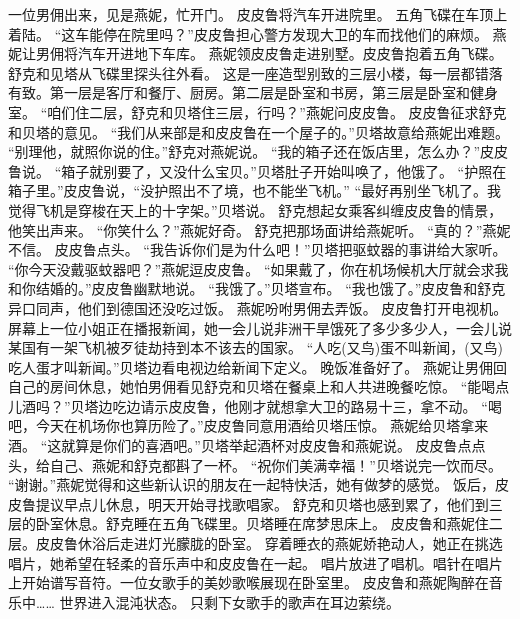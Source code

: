 \documentclass[a4paper,12pt,UTF8,twoside]{ctexbook}
\begin{document}
        一位男佣出来，见是燕妮，忙开门。 
        皮皮鲁将汽车开进院里。 
        五角飞碟在车顶上着陆。 
        “这车能停在院里吗？”皮皮鲁担心警方发现大卫的车而找他们的麻烦。 
        燕妮让男佣将汽车开进地下车库。 
        燕妮领皮皮鲁走进别墅。皮皮鲁抱着五角飞碟。舒克和见塔从飞碟里探头往外看。 
        这是一座造型别致的三层小楼，每一层都错落有致。第一层是客厅和餐厅、厨房。第二层是卧室和书房，第三层是卧室和健身室。 
        “咱们住二层，舒克和贝塔住三层，行吗？”燕妮问皮皮鲁。 
        皮皮鲁征求舒克和贝塔的意见。 
        “我们从来部是和皮皮鲁在一个屋子的。”贝塔故意给燕妮出难题。 
        “别理他，就照你说的住。”舒克对燕妮说。 
        “我的箱子还在饭店里，怎么办？”皮皮鲁说。 
        “箱子就别要了，又没什么宝贝。”贝塔肚子开始叫唤了，他饿了。 
        “护照在箱子里。”皮皮鲁说，“没护照出不了境，也不能坐飞机。” 
        “最好再别坐飞机了。我觉得飞机是穿梭在天上的十字架。”贝塔说。 
        舒克想起女乘客纠缠皮皮鲁的情景，他笑出声来。 
        “你笑什么？”燕妮好奇。 
        舒克把那场面讲给燕妮听。 
        “真的？”燕妮不信。 
        皮皮鲁点头。 
        “我告诉你们是为什么吧！”贝塔把驱蚊器的事讲给大家听。 
        “你今天没戴驱蚊器吧？”燕妮逗皮皮鲁。 
        “如果戴了，你在机场候机大厅就会求我和你结婚的。”皮皮鲁幽默地说。 
        “我饿了。”贝塔宣布。 
        “我也饿了。”皮皮鲁和舒克异口同声，他们到德国还没吃过饭。 
        燕妮吩咐男佣去弄饭。 
        皮皮鲁打开电视机。 
        屏幕上一位小姐正在播报新闻，她一会儿说非洲干旱饿死了多少多少人，一会儿说某国有一架飞机被歹徒劫持到本不该去的国家。 
        “人吃(又鸟)蛋不叫新闻，(又鸟)吃人蛋才叫新闻。”贝塔边看电视边给新闻下定义。 
        晚饭准备好了。 
        燕妮让男佣回自己的房间休息，她怕男佣看见舒克和贝塔在餐桌上和人共进晚餐吃惊。 
        “能喝点儿酒吗？”贝塔边吃边请示皮皮鲁，他刚才就想拿大卫的路易十三，拿不动。 
        “喝吧，今天在机场你也算历险了。”皮皮鲁同意用酒给贝塔压惊。 
        燕妮给贝塔拿来酒。 
        “这就算是你们的喜酒吧。”贝塔举起酒杯对皮皮鲁和燕妮说。 
        皮皮鲁点点头，给自己、燕妮和舒克都斟了一杯。 
        “祝你们美满幸福！”贝塔说完一饮而尽。 
        “谢谢。”燕妮觉得和这些新认识的朋友在一起特快活，她有做梦的感觉。 
        饭后，皮皮鲁提议早点儿休息，明天开始寻找歌唱家。 
        舒克和贝塔也感到累了，他们到三层的卧室休息。舒克睡在五角飞碟里。贝塔睡在席梦思床上。 
        皮皮鲁和燕妮住二层。皮皮鲁休浴后走进灯光朦胧的卧室。 
        穿着睡衣的燕妮娇艳动人，她正在挑选唱片，她希望在轻柔的音乐声中和皮皮鲁在一起。 
        唱片放进了唱机。唱针在唱片上开始谱写音符。一位女歌手的美妙歌喉展现在卧室里。 
        皮皮鲁和燕妮陶醉在音乐中…… 
        世界进入混沌状态。 
        只剩下女歌手的歌声在耳边萦绕。 
\end{document}
